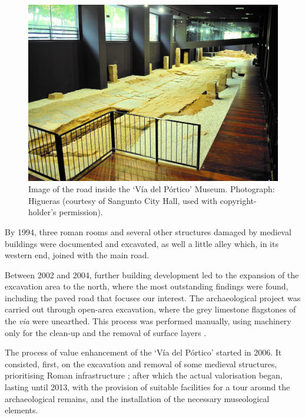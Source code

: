 	\begin{figure}[!htb]
		\includegraphics[width=.9\linewidth]{figures/verdu_Fig6}
		\centering
		\caption{Image of the road inside the ‘Vía del Pórtico’ Museum. Photograph: Higueras (courtesy of Sangunto City Hall, used with copyright-holder’s permission).}
		\label{fig:verdu_Fig6}
	\end{figure}
	
By 1994, three roman rooms and several other structures damaged by medieval buildings were documented and excavated, as well a little alley which, in its western end, joined with the main road.

Between 2002 and 2004, further building development led to the expansion of the excavation area to the north, where the most outstanding findings were found, including the paved road that focuses our interest. The archaeological project was carried out through open-area excavation, where the grey limestone flagstones of the \textit{via} were unearthed. This process was performed manually, using machinery only for the clean-up and the removal of surface layers \parencite[323]{Melchor_2005b}. 

The process of value enhancement of the ‘Vía del Pórtico’ started in 2006. It consisted, first, on the excavation and removal of some medieval structures, prioritising Roman infrastructure \parencite[326]{Melchor_2005b}; after which the actual valorisation began, lasting until 2013, with the provision of suitable facilities for a tour around the archaeological remains, and the installation of the necessary museological elements.


